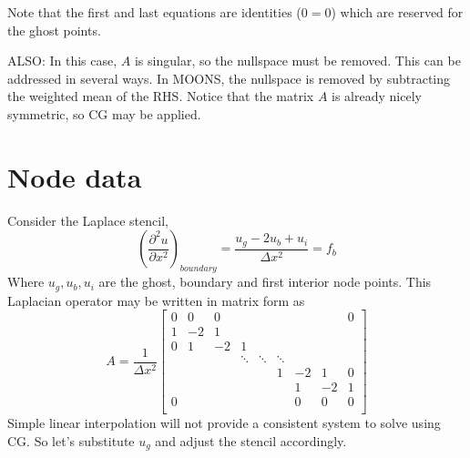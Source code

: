 \documentclass[landscape]{article}
\begin{document}
Note that the first and last equations are identities ($0=0$) which are reserved for the ghost points.

ALSO: In this case, $A$ is singular, so the nullspace must be removed. This can be addressed in several ways. In MOONS, the nullspace is removed by subtracting the weighted mean of the RHS. Notice that the matrix $A$ is already nicely symmetric, so CG may be applied.

\newpage
\section{Node data}
Consider the Laplace stencil,
\begin{equation}
   \left(\frac{\partial^2 u}{\partial x^2}\right)_{boundary} = 
   \frac{u_g - 2 u_b + u_i}{\Delta x^2} = f_b
\end{equation}
Where $u_g,u_b,u_i$ are the ghost, boundary and first interior node points. This Laplacian operator may be written in matrix form as
\[ A = \frac{1}{\Delta x^2} \left[\begin{array}{ccccccccc}
0  & 0     & 0         &           &           &           &           &         &  0 \\
1  & -2    & 1         &           &           &           &           &         &    \\
0  & 1     & -2        & 1         &           &           &           &         &    \\
   &       &           & \ddots    & \ddots    & \ddots    &           &         &    \\
   &       &           &           &           & 1         & -2        & 1       &  0 \\
   &       &           &           &           &           &  1        & -2      &  1 \\
0  &       &           &           &           &           &  0        & 0       &  0 \\
\end{array} \right]
\]
Simple linear interpolation will not provide a consistent system to solve using CG. So let's substitute $u_g$ and adjust the stencil accordingly.
\end{document}
